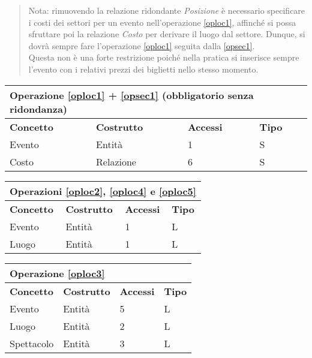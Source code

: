 \documentclass[a4paper,11pt]{article}
\begin{document}
\begin{quote}
  Nota: rimuovendo la relazione ridondante \emph{Posizione} è necessario specificare i costi dei settori per un evento nell'operazione \ref{oploc1},
  affinché si possa sfruttare poi la relazione \emph{Costo} per derivare il luogo dal settore.
  Dunque, si dovrà sempre fare l'operazione \ref{oploc1} seguita dalla \ref{opsec1}.\\
  Questa non è una forte restrizione poiché nella pratica si
  inserisce sempre l'evento con i relativi prezzi dei biglietti nello stesso momento.
\end{quote}
\begin{tabularx}{\textwidth}{|X|X|X|X|}
\hline
  \multicolumn{4}{|l|}{\textbf{Operazione \ref{oploc1} + \ref{opsec1} (obbligatorio senza ridondanza)}} \\
\hline
\textbf{Concetto} & \textbf{Costrutto} & \textbf{Accessi} & \textbf{Tipo}\\
\hline
Evento & Entità & 1 & S \\
\hline
Costo & Relazione & 6 & S \\
\hline
\end{tabularx}
\newline
\vspace*{1em}
\newline
\begin{tabularx}{\textwidth}{|X|X|X|X|}
\hline
  \multicolumn{4}{|l|}{\textbf{Operazioni \ref{oploc2}, \ref{oploc4} e \ref{oploc5}}} \\
\hline
\textbf{Concetto} & \textbf{Costrutto} & \textbf{Accessi} & \textbf{Tipo}\\
\hline
Evento & Entità & 1 & L \\
\hline
Luogo & Entità & 1 & L \\
\hline
\end{tabularx}
\newline
\vspace*{1em}
\newline
\begin{tabularx}{\textwidth}{|X|X|X|X|}
\hline
  \multicolumn{4}{|l|}{\textbf{Operazione \ref{oploc3}}} \\
\hline
\textbf{Concetto} & \textbf{Costrutto} & \textbf{Accessi} & \textbf{Tipo}\\
\hline
Evento & Entità & 5 & L \\
\hline
Luogo & Entità & 2 & L \\
\hline
Spettacolo & Entità & 3 & L \\
\hline
\end{tabularx}
\end{document}
